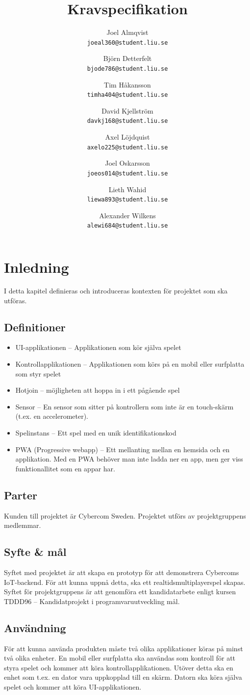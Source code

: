 \documentclass[10pt]{article}
\title{Kravspecifikation}
\author{
    Joel Almqvist\\
    \texttt{joeal360@student.liu.se}
    \and
    Björn Detterfelt\\
    \texttt{bjode786@student.liu.se}
    \and
    Tim Håkansson\\
    \texttt{timha404@student.liu.se}
    \and
    David Kjellström\\
    \texttt{davkj168@student.liu.se}
    \and
    Axel Löjdquist\\
    \texttt{axelo225@student.liu.se}
    \and
    Joel Oskarsson\\
    \texttt{joeos014@student.liu.se}
    \and
    Lieth Wahid\\
    \texttt{liewa893@student.liu.se}
    \and
    Alexander Wilkens\\
    \texttt{alewi684@student.liu.se}
}
\begin{document}
\maketitle
\pagebreak
\tableofcontents
\pagebreak
\section{Inledning}
	I detta kapitel definieras och introduceras kontexten för projektet som ska utföras.

	\subsection{Definitioner}
		\begin{itemize}
		\item UI-applikationen -- Applikationen som kör själva spelet
		\item Kontrollapplikationen -- Applikationen som körs på en mobil eller surfplatta som styr spelet
		\item Hotjoin -- möjligheten att hoppa in i ett pågående spel
		\item Sensor -- En sensor som sitter på kontrollern som inte är en touch-skärm (t.ex. en accelerometer).
		\item Spelinstans -- Ett spel med en unik identifikationskod
		\item PWA (Progressive webapp) -- Ett mellanting mellan en hemsida och en applikation. Med en PWA behöver man inte ladda ner en app, men ger viss funktionallitet som en appar har.
		\end{itemize}	

	\subsection{Parter}
	Kunden till projektet är Cybercom Sweden. Projektet utförs av projektgruppens medlemmar.
	
	\subsection{Syfte \& mål}
		Syftet med projektet är att skapa en prototyp för att demonstrera Cybercoms IoT-backend. För att kunna uppnå detta, ska ett realtidsmultiplayerspel skapas. Syftet för projektgruppens är att genomföra ett kandidatarbete enligt kursen TDDD96 -- Kandidatprojekt i programvaruutveckling mål.
	
	\subsection{Användning}
		För att kunna använda produkten måste två olika applikationer köras på minst två olika enheter. En mobil eller surfplatta ska användas som kontroll för att styra spelet och kommer att köra kontrollapplikationen. Utöver detta ska en enhet som t.ex. en dator vara uppkopplad till en skärm. Datorn ska köra själva spelet och kommer att köra UI-applikationen.  
	
\end{document}
